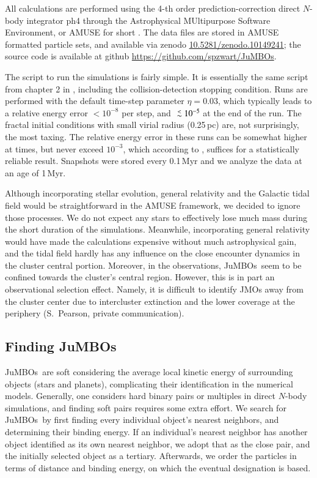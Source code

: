 \documentclass[submission,phys]{lib/SciPost}
\def\aplt{\ {\raise-.5ex\hbox{$\buildrel<\over\sim$}}\ }
\newcommand{\jumbos}{\mbox{JuMBOs}}
\begin{document}
All calculations are performed using the 4-th order prediction-correction
direct $N$-body integrator {\sc ph4} \cite{2022A&A...659A..86P}
through the Astrophysical MUltipurpose Software Environment, or AMUSE
for short
\cite{2013CoPhC.183..456P,2013AA...557A..84P,2018araa.book.....P}.
The data files are stored in {\sc AMUSE} formatted particle sets, and
available via zenodo \url{10.5281/zenodo.10149241}; the source
code is available at github \url{https://github.com/spzwart/JuMBOs}.

The script to run the simulations is fairly simple.  It is essentially
the same script from chapter 2 in \cite{2018araa.book.....P},
including the collision-detection stopping condition.  Runs are
performed with the default time-step parameter $\eta=0.03$, which
typically leads to a relative energy error $<10^{-8}$ per step, and
$\aplt 10^{-5}$ at the end of the run. The fractal initial conditions
with small virial radius (0.25\,pc) are, not surprisingly, the most
taxing.  The relative energy error in these runs can be somewhat
higher at times, but never exceed $10^{-3}$, which according to
\cite{2041-8205-785-1-L3}, suffices for a statistically reliable
result.  Snapshots were stored every 0.1\,Myr and we analyze the data
at an age of 1\,Myr.

Although incorporating stellar evolution, general relativity and the
Galactic tidal field would be straightforward in the AMUSE framework,
we decided to ignore those processes.  We do not expect any stars to
effectively lose much mass during the short duration of the
simulations. Meanwhile, incorporating general relativity would have made the
calculations expensive without much astrophysical gain, and the tidal
field hardly has any influence on the close encounter dynamics in the
cluster central portion.  Moreover, in the observations,
\jumbos\, seem to be confined towards the cluster's central region.
However, this is in part an observational selection effect. Namely, it is
difficult to identify JMOs away from the cluster center due to intercluster 
extinction and the lower coverage at the periphery (S.\, Pearson, 
private communication).

\subsection{Finding \jumbos}

\jumbos\, are soft considering the average local kinetic energy of
surrounding objects (stars and planets), complicating their identification
in the numerical models.  Generally, one considers hard
binary pairs or multiples in direct $N$-body simulations, and finding
soft pairs requires some extra effort.  We search for \jumbos\,
by first finding every individual object's nearest neighbors, 
and determining their binding energy. If an individual's nearest
neighbor has another object identified as its own nearest neighbor, we
adopt that as the close pair, and the initially selected object as
a tertiary. Afterwards, we order the particles in terms of distance and
binding energy, on which the eventual designation is based.
\end{document}
